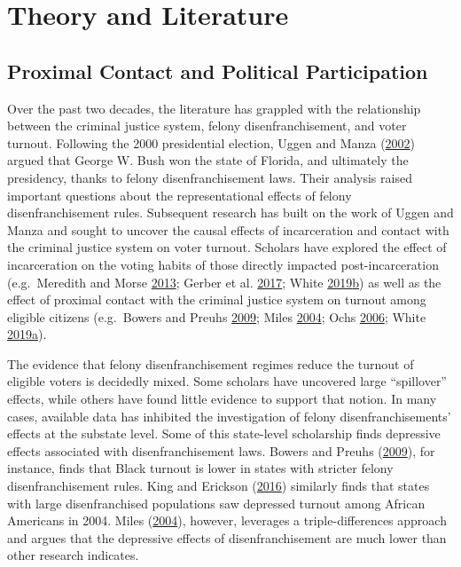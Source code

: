 \documentclass[
  12pt,
]{article}
\begin{document}
\hypertarget{theory-and-literature}{%
\section*{Theory and Literature}\label{theory-and-literature}}

\hypertarget{proximal-contact-and-political-participation}{%
\subsection*{Proximal Contact and Political Participation}\label{proximal-contact-and-political-participation}}

Over the past two decades, the literature has grappled with the relationship between the criminal justice system, felony disenfranchisement, and voter turnout. Following the 2000 presidential election, Uggen and Manza (\protect\hyperlink{ref-Uggen2002}{2002}) argued that George W. Bush won the state of Florida, and ultimately the presidency, thanks to felony disenfranchisement laws. Their analysis raised important questions about the representational effects of felony disenfranchisement rules. Subsequent research has built on the work of Uggen and Manza and sought to uncover the causal effects of incarceration and contact with the criminal justice system on voter turnout. Scholars have explored the effect of incarceration on the voting habits of those directly impacted post-incarceration (e.g.~Meredith and Morse \protect\hyperlink{ref-Meredith2013}{2013}; Gerber et al. \protect\hyperlink{ref-Gerber2017}{2017}; White \protect\hyperlink{ref-White2019}{2019}\protect\hyperlink{ref-White2019}{b}) as well as the effect of proximal contact with the criminal justice system on turnout among eligible citizens (e.g.~Bowers and Preuhs \protect\hyperlink{ref-Bowers2009}{2009}; Miles \protect\hyperlink{ref-Miles2004}{2004}; Ochs \protect\hyperlink{ref-Ochs2006}{2006}; White \protect\hyperlink{ref-White2019a}{2019}\protect\hyperlink{ref-White2019a}{a}).

The evidence that felony disenfranchisement regimes reduce the turnout of eligible voters is decidedly mixed. Some scholars have uncovered large ``spillover'' effects, while others have found little evidence to support that notion. In many cases, available data has inhibited the investigation of felony disenfranchisements' effects at the substate level. Some of this state-level scholarship finds depressive effects associated with disenfranchisement laws. Bowers and Preuhs (\protect\hyperlink{ref-Bowers2009}{2009}), for instance, finds that Black turnout is lower in states with stricter felony disenfranchisement rules. King and Erickson (\protect\hyperlink{ref-King2016}{2016}) similarly finds that states with large disenfranchised populations saw depressed turnout among African Americans in 2004. Miles (\protect\hyperlink{ref-Miles2004}{2004}), however, leverages a triple-differences approach and argues that the depressive effects of disenfranchisement are much lower than other research indicates.
\end{document}
